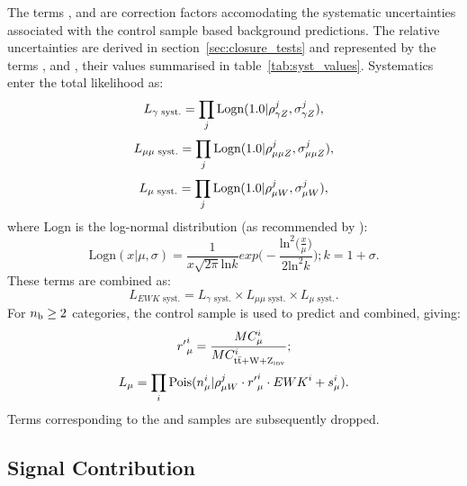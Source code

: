 The terms \rhopz, \rhommz and \rhomw are correction factors accomodating the
systematic uncertainties associated with the control sample based background 
predictions. The relative uncertainties are derived in
section~\ref{sec:closure_tests} and represented by the terms \sigmapz, \sigmammz
and \sigmamw, their 
values summarised in table~\ref{tab:syst_values}. Systematics enter the total
likelihood as:
% 
\begin{equation}
L_{\gamma\text{ syst.}} = \prod_j \text{Logn}(1.0 | \rho^j_{\gamma Z}, \sigma^j_{\gamma Z}),
\end{equation}
\begin{equation}
L_{\mu\mu\text{ syst.}} = \prod_j \text{Logn}(1.0 | \rho^j_{\mu\mu Z}, \sigma^j_{\mu\mu Z}),
\end{equation}
\begin{equation}
L_{\mu\text{ syst.}} = \prod_j \text{Logn}(1.0 | \rho^j_{\mu W}, \sigma^j_{\mu W}),
\end{equation}
% 
where Logn is the log-normal distribution (as recommended by \cite{cousins-log-normal}):
% 
\begin{equation}
\text{Logn}(x|\mu, \sigma) = \frac{1}{x\sqrt{2\pi}\text{ln}k} exp \Bigg(-\frac{\text{ln}^2 \big(\frac{x}{\mu}\big)}{2\text{ln}^2k}\Bigg); \xspace k = 1+\sigma .
\end{equation}
% 
These terms are combined as:
% 
\begin{equation}
L_{EWK\text{ syst.}} = L_{\gamma\text{ syst.}} \times L_{\mu\mu\text{ syst.}} \times L_{\mu\text{ syst.}}.
\end{equation}
% 
For $n_{\text{b}} \geq 2$ categories, the \mj control sample is used to predict \zinv and
\ttw combined, giving:
% 
\begin{equation}
{r'}^i_{\mu} = \frac{MC_{\mu}^i}{MC^i_{\rm{t}\bar{\rm{t}} + W + Z_{\text{inv}}}};
\end{equation}
% 
\begin{equation}
L_{\mu} = \prod_i \text{Pois}(n_{\mu}^i | \rho^j_{\mu W} \cdot {r'}_{\mu}^i \cdot {EWK}^i + s_{\mu}^i).
\end{equation}
% 
Terms corresponding to the \mmj and \gj samples are subsequently dropped.

\subsection{Signal Contribution}

